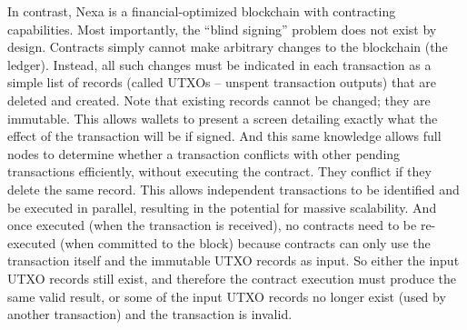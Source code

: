 \documentclass[a4paper, 11pt]{article}
\begin{document}
In contrast, Nexa is a financial-optimized blockchain with contracting capabilities.  Most importantly, the “blind signing” problem does not exist by design.  Contracts simply cannot make arbitrary changes to the blockchain (the ledger).  Instead, all such changes must be indicated in each transaction as a simple list of records (called UTXOs – unspent transaction outputs) that are deleted and created.  Note that existing records cannot be changed; they are immutable.  This allows wallets to present a screen detailing exactly what the effect of the transaction will be if signed.  
And this same knowledge allows full nodes to determine whether a transaction conflicts with other pending transactions efficiently, without executing the contract.  They conflict if they delete the same record.  This allows independent transactions to be identified and be executed in parallel, resulting in the potential for massive scalability.  And once executed (when the transaction is received), no contracts need to be re-executed (when committed to the block) because contracts can only use the transaction itself and the immutable UTXO records as input.  So either the input UTXO records still exist, and therefore the contract execution must produce the same valid result, or some of the input UTXO records no longer exist (used by another transaction) and the transaction is invalid.
\end{document}
